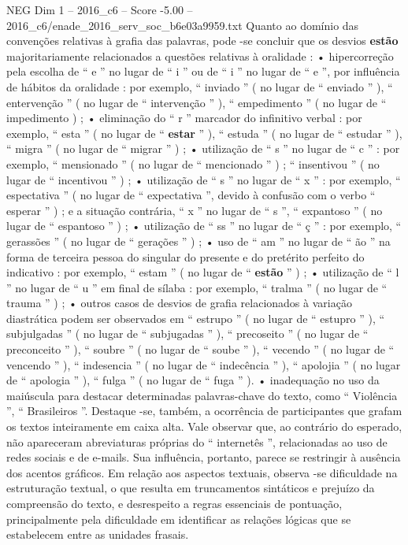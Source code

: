 \begin{textsample}{NEG Dim 1 – 2016\_c6 – Score -5.00 – 2016\_c6/enade\_2016\_serv\_soc\_b6e03a9959.txt}
Quanto ao domínio das convenções relativas à grafia das palavras, pode -se concluir que os desvios \textbf{estão} majoritariamente relacionados a questões relativas à oralidade : • hipercorreção pela escolha de “ e ” no lugar de “ i ” ou de “ i ” no lugar de “ e ”, por influência de hábitos da oralidade : por exemplo, “ inviado ” ( no lugar de “ enviado ” ), “ entervenção ” ( no lugar de “ intervenção ” ), “ empedimento ” ( no lugar de “ impedimento ) ; • eliminação do “ r ” marcador do infinitivo verbal : por exemplo, “ esta ” ( no lugar de “ \textbf{estar} ” ), “ estuda ” ( no lugar de “ estudar ” ), “ migra ” ( no lugar de “ migrar ” ) ; • utilização de “ s ” no lugar de “ c ” : por exemplo, “ mensionado ” ( no lugar de “ mencionado ” ) ; “ insentivou ” ( no lugar de “ incentivou ” ) ; • utilização de “ s ” no lugar de “ x ” : por exemplo, “ espectativa ” ( no lugar de “ expectativa ”, devido à confusão com o verbo “ esperar ” ) ; e a situação contrária, “ x ” no lugar de “ s ”, “ expantoso ” ( no lugar de “ espantoso ” ) ; • utilização de “ ss ” no lugar de “ ç ” : por exemplo, “ gerassões ” ( no lugar de “ gerações ” ) ; • uso de “ am ” no lugar de “ ão ” na forma de terceira pessoa do singular do presente e do pretérito perfeito do indicativo : por exemplo, “ estam ” ( no lugar de “ \textbf{estão} ” ) ; • utilização de “ l ” no lugar de “ u ” em final de sílaba : por exemplo, “ tralma ” ( no lugar de “ trauma ” ) ; • outros casos de desvios de grafia relacionados à variação diastrática podem ser observados em “ estrupo ” ( no lugar de “ estupro ” ), “ subjulgadas ” ( no lugar de “ subjugadas ” ), “ precoseito ” ( no lugar de “ preconceito ” ), “ soubre ” ( no lugar de “ soube ” ), “ vecendo ” ( no lugar de “ vencendo ” ), “ indesencia ” ( no lugar de “ indecência ” ), “ apolojia ” ( no lugar de “ apologia ” ), “ fulga ” ( no lugar de “ fuga ” ). • inadequação no uso da maiúscula para destacar determinadas palavras-chave do texto, como “ Violência ”, “ Brasileiros ”.
Destaque -se, também, a ocorrência de participantes que grafam os textos inteiramente em caixa alta.
Vale observar que, ao contrário do esperado, não apareceram abreviaturas próprias do “ internetês ”, relacionadas ao uso de redes sociais e de e-mails.
Sua influência, portanto, parece se restringir à ausência dos acentos gráficos.
Em relação aos aspectos textuais, observa -se dificuldade na estruturação textual, o que resulta em truncamentos sintáticos e prejuízo da compreensão do texto, e desrespeito a regras essenciais de pontuação, principalmente pela dificuldade em identificar as relações lógicas que se estabelecem entre as unidades frasais.

\end{textsample}
